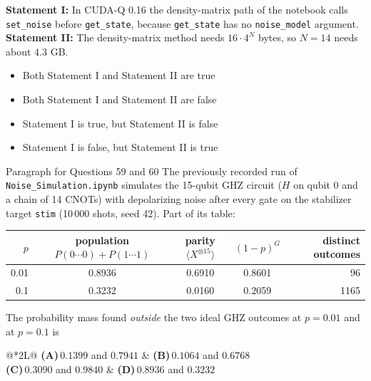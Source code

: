 \documentclass[11pt,a4paper]{article}
\newcommand{\optlabel}[1]{\textbf{(#1)}}
\newenvironment{qitem}[1]{\begin{list}{}{\setlength{\leftmargin}{3.3em}\setlength{\labelwidth}{3.1em}%
  \setlength{\labelsep}{0.2em}\setlength{\topsep}{3pt}\setlength{\parsep}{3pt}}\item[\textbf{Q.#1}\hfill]}{\end{list}}
\newcommand{\qsep}{\par\vspace{2pt}{\color{black!15}\hrule}\vspace{4pt}}
\begin{document}
\begin{qitem}{58}
\textbf{Statement I:} In CUDA-Q 0.16 the density-matrix path of the notebook calls \texttt{set\_noise} before \texttt{get\_state},
because \texttt{get\_state} has no \texttt{noise\_model} argument.\\[1mm]
\textbf{Statement II:} The density-matrix method needs $16\cdot4^N$ bytes, so $N = 14$ needs about $4.3$ GB.
\begin{itemize}[leftmargin=2.6em, labelsep=0.4em, itemsep=2pt, topsep=3pt]
\item[\optlabel{A}] Both Statement I and Statement II are true
\item[\optlabel{B}] Both Statement I and Statement II are false
\item[\optlabel{C}] Statement I is true, but Statement II is false
\item[\optlabel{D}] Statement I is false, but Statement II is true
\end{itemize}
\end{qitem}
\qsep

\begin{passagebox}{Paragraph for Questions 59 and 60}
The previously recorded run of \texttt{Noise\_Simulation.ipynb} simulates the 15-qubit GHZ circuit ($H$ on qubit 0 and a chain of
14 CNOTs) with depolarizing noise after every gate on the stabilizer target \texttt{stim} (10\,000 shots, seed 42). Part of its table:
\begin{center}\small
\begin{tabular}{rcccr}\toprule
$p$ & population $P(0\cdots0) + P(1\cdots1)$ & parity $\langle X^{\otimes15}\rangle$ & $(1-p)^G$ & distinct outcomes\\ \midrule
0.01 & 0.8936 & 0.6910 & 0.8601 & 96\\
0.1 & 0.3232 & 0.0160 & 0.2059 & 1165\\ \bottomrule
\end{tabular}
\end{center}
\end{passagebox}
\begin{qitem}{59}
The probability mass found \emph{outside} the two ideal GHZ outcomes at $p = 0.01$ and at $p = 0.1$ is
\par\smallskip\noindent\begin{tabularx}{\linewidth}{@{}*{2}{L}@{}}
\optlabel{A}\,$0.1399$ and $0.7941$ & \optlabel{B}\,$0.1064$ and $0.6768$ \\[3pt]
\optlabel{C}\,$0.3090$ and $0.9840$ & \optlabel{D}\,$0.8936$ and $0.3232$
\end{tabularx}
\end{qitem}
\qsep
\end{document}
